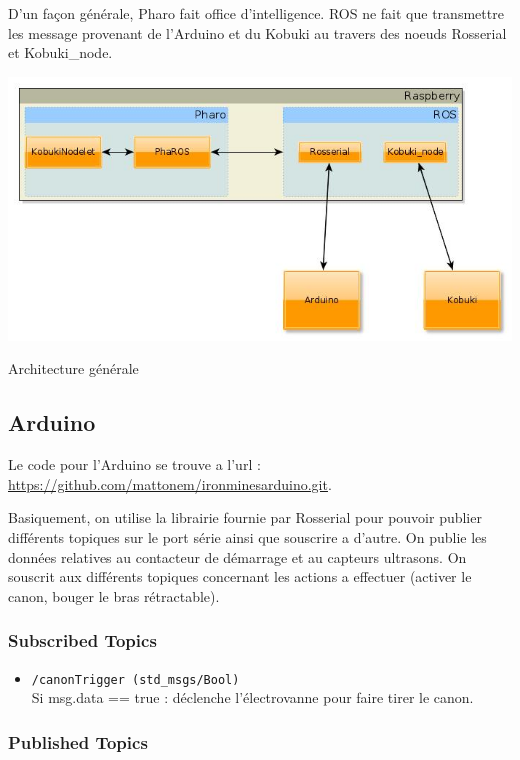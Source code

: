 \documentclass[a4paper, 11pt]{article}
\begin{document}
D'un façon générale, Pharo fait office d'intelligence. ROS ne fait que
transmettre les message provenant de l'Arduino et du Kobuki au travers
des noeuds Rosserial et Kobuki\_node.
\begin{center}
  \includegraphics[width=\linewidth]{./architecture.jpg}
  \caption{Architecture générale}
  \label{archi_generale}
\end{center}
\subsection{Arduino}
Le code pour l'Arduino se trouve a l'url
:\\ \url{https://github.com/mattonem/ironminesarduino.git}.

Basiquement, on utilise la librairie fournie par Rosserial pour
pouvoir publier différents topiques sur le port série ainsi que souscrire
a d'autre. On publie les données relatives au contacteur de démarrage
et au capteurs ultrasons. On souscrit aux différents topiques concernant
les actions a effectuer (activer le canon, bouger le bras
rétractable).

\subsubsection{Subscribed Topics}

\begin{itemize}
\item \texttt{/canonTrigger (std\_msgs/Bool)}\\ 
  Si msg.data == true :
  déclenche l'électrovanne pour faire tirer le canon.
\end{itemize}

\subsubsection{Published Topics}
\end{document}
